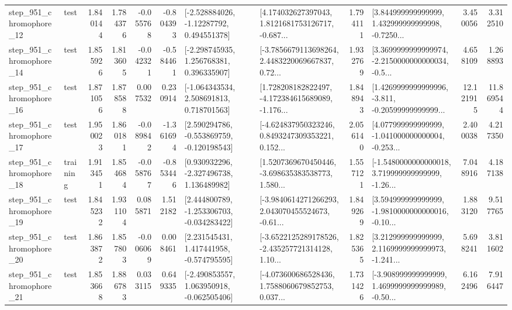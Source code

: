 \begin{tabular}{llrrrrllrlrr}
  step\_951\_chromophore\_12 &      test &      1.840144 &    1.784376 &     -0.055768 & -0.804393 &    [-2.528884026, -1.12287792, 0.494551378] &  [4.174032627397043, 1.8121681753126717, -0.687... &       1.794111 &  [3.844999999999999, 1.432999999999998, -0.7250... &            3.450056 &          3.312510 \\
  step\_951\_chromophore\_14 &      test &      1.855926 &    1.813605 &     -0.042321 & -0.584461 &    [-2.298745935, 1.256768381, 0.396335907] &  [-3.7856679113698264, 2.4483220069667837, 0.72... &       1.932769 &  [3.3699999999999974, -2.2150000000000034, -0.5... &            4.658109 &          1.268893 \\
  step\_951\_chromophore\_16 &      test &      1.871056 &    1.878588 &      0.007532 &  0.230914 &    [-1.064343534, 2.508691813, 0.718701563] &  [1.728208182822497, -4.172384615689089, -1.176... &       1.848943 &  [1.4269999999999996, -3.811, -0.20599999999999... &           12.121915 &         11.869544 \\
  step\_951\_chromophore\_17 &      test &      1.950023 &    1.860181 &     -0.089842 & -1.361694 &   [2.590294786, -0.553869759, -0.120198543] &  [-4.624837950323246, 0.8493247309353221, 0.152... &       2.056140 &  [4.077999999999999, -1.041000000000004, -0.253... &            2.400038 &          4.217350 \\
  step\_951\_chromophore\_18 &  training &      1.913451 &    1.854684 &     -0.058767 & -0.853446 &    [0.930932296, -2.327496738, 1.136489982] &  [1.5207369670450446, -3.698635383538773, 1.580... &       1.557121 &  [-1.5480000000000018, 3.719999999999999, -1.26... &            7.048916 &          4.187138 \\
  step\_951\_chromophore\_19 &      test &      1.845232 &    1.931104 &      0.085871 &  1.512182 &   [2.444800789, -1.253306703, -0.034283422] &  [-3.9840614271266293, 2.043070455524673, -0.61... &       1.849269 &  [3.594999999999999, -1.9810000000000016, -0.10... &            1.883120 &          9.517765 \\
  step\_951\_chromophore\_20 &      test &      1.863872 &    1.857803 &     -0.006069 &  0.008461 &    [2.231545431, 1.417441958, -0.574795595] &  [-3.6522125289178526, -2.435257721314128, 1.10... &       1.825365 &  [3.212999999999999, 2.1169999999999973, -1.241... &            5.698241 &          3.811602 \\
  step\_951\_chromophore\_21 &      test &      1.853668 &    1.886783 &      0.033115 &  0.649335 &   [-2.490853557, 1.063950918, -0.062505406] &  [-4.073600686528436, 1.7588060679852753, 0.037... &       1.731426 &  [-3.908999999999999, 1.4699999999999989, -0.50... &            6.162496 &          7.916447 \\

\end{tabular}
